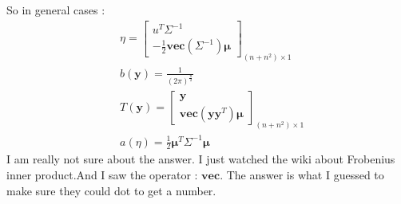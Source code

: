 \documentclass[a4paper]{article}
\begin{document}
So in general cases :
\begin{equation*}
\begin{aligned}
&\eta = \begin{bmatrix}
u^T \Sigma^{-1}\\
-\frac 1 2 \mathbf{vec}(\Sigma^{-1})
\mathbf{\mu}
\end{bmatrix}_{(n+n^2) \times 1} \\
&b(\mathbf{y}) = \frac {1}{(2 \pi)^{\frac n 2}}\\
&T(\mathbf{y}) =  \begin{bmatrix}
\mathbf{y}\\
\mathbf{vec}(\mathbf{yy}^T)
\mathbf{\mu}
\end{bmatrix}_{(n+n^2) \times 1} \\
&a(\eta) = \frac 1 2  \mathbf{\mu}^T \Sigma^{-1}\mathbf{\mu}
\end{aligned}
\end{equation*}
I am really not sure about the answer. I just watched the wiki about Frobenius inner product.And I saw the operator : $\mathbf{vec}$. The answer is what I guessed to make sure they could dot to get a number.
\end{document}
